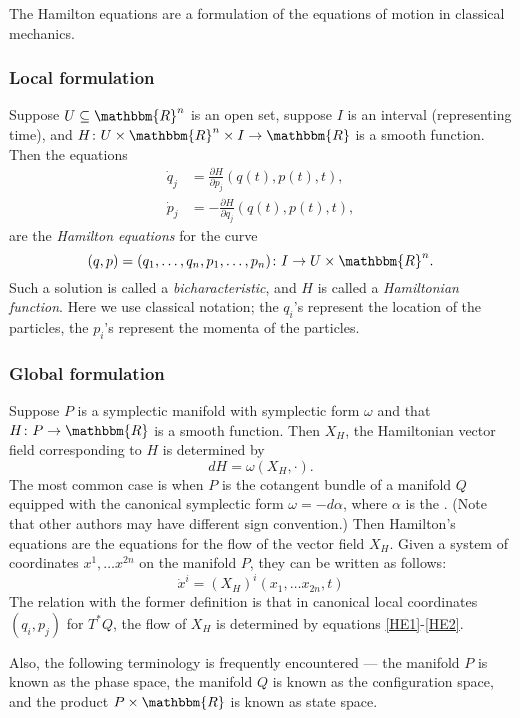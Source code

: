 \documentclass[12pt]{article}
\newcommand{\R}{\mathbbm{R}}
\begin{document}
The Hamilton equations are a formulation of the equations of motion in classical mechanics.

\subsubsection*{Local formulation}
Suppose $U\subseteq \R^n$ is an open set, suppose $I$ is an interval
(representing time), and $H\colon U\times \R^n\times I\to \R$
is a smooth function. Then the equations
\begin{align}
\label{HE1}
\dot{q}_j &= \frac{\partial H}{\partial p_j}(q(t),p(t),t), \\
\label{HE2}
\dot{p}_j &= -\frac{\partial H}{\partial q_j}(q(t),p(t),t), 
\end{align}
are the \emph{Hamilton equations} for the curve
$$
  (q, p)=(q_1,\ldots, q_n, p_1,\ldots, p_n) \colon I\to U\times \R^n.
$$
Such a solution is called a \emph{bicharacteristic}, and $H$ is
called a \emph{Hamiltonian function}. Here we use classical notation;
the $q_i$'s represent the location of the particles, 
the $p_i$'s represent the momenta of the  particles.


\subsubsection*{Global formulation}
Suppose $P$ is a symplectic manifold with symplectic form $\omega$ and that $H\colon P\to \R$
is a smooth function.  Then $X_H$, the Hamiltonian 
vector field corresponding to $H$ is determined by 
$$
  dH=\omega(X_H,\cdot).
$$
The most common case is when $P$ is the cotangent bundle of a manifold $Q$
equipped with the canonical symplectic form $\omega=-d\alpha$, 
where $\alpha$ is the .  (Note that other authors may have different sign convention.)  Then Hamilton's equations are the equations for the flow of the vector field $X_H$.  Given a system of coordinates $x^1, \ldots x^{2n}$ on the manifold $P$, they can be written as follows:
$$
 \dot x^i = (X_H)^i (x_1, \ldots x_{2n}, t)
$$
The relation with the former definition is that in canonical 
local coordinates $(q_i,p_j)$ for $T^\ast Q$, the flow of $X_H$ 
is determined by equations \eqref{HE1}-\eqref{HE2}.

Also, the following terminology is frequently encountered --- the manifold $P$ is known as the phase space, the manifold $Q$ is known as the configuration space, and the product $P \times\R$ is known as state space.
\end{document}
